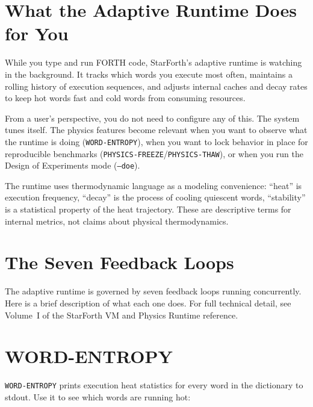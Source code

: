 \section{What the Adaptive Runtime Does for You}
\label{sec:physics-what}

While you type and run FORTH code, StarForth's adaptive runtime is watching in
the background. It tracks which words you execute most often, maintains a
rolling history of execution sequences, and adjusts internal caches and decay
rates to keep hot words fast and cold words from consuming resources.

From a user's perspective, you do not need to configure any of this. The
system tunes itself. The physics features become relevant when you want to
observe what the runtime is doing (\texttt{WORD-ENTROPY}), when you want to
lock behavior in place for reproducible benchmarks
(\texttt{PHYSICS-FREEZE}/\texttt{PHYSICS-THAW}), or when you run the Design
of Experiments mode (\texttt{--doe}).

The runtime uses thermodynamic language as a modeling convenience: ``heat'' is
execution frequency, ``decay'' is the process of cooling quiescent words,
``stability'' is a statistical property of the heat trajectory. These are
descriptive terms for internal metrics, not claims about physical
thermodynamics.

\section{The Seven Feedback Loops}
\label{sec:seven-loops}

The adaptive runtime is governed by seven feedback loops running concurrently.
Here is a brief description of what each one does. For full technical detail,
see Volume~I of the StarForth VM and Physics Runtime reference.



\section{WORD-ENTROPY}
\label{sec:word-entropy}

\texttt{WORD-ENTROPY} prints execution heat statistics for every word in the
dictionary to stdout. Use it to see which words are running hot:

